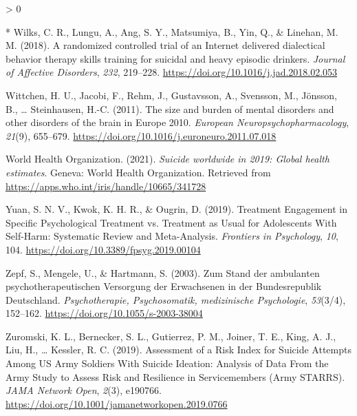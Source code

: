 \documentclass[
  english,
  man]{apa6}
\newlength{\cslhangindent}
\newenvironment{CSLReferences}[2] %
 {%
  \setlength{\parindent}{0pt}
  \ifodd #1 \everypar{\setlength{\hangindent}{\cslhangindent}}\ignorespaces\fi
  \ifnum #2 > 0
  \setlength{\parskip}{#2\baselineskip}
  \fi
 }%
 {}
\begin{document}
\begin{CSLReferences}{1}{0}
\leavevmode\hypertarget{ref-wilks2018}{}%
* Wilks, C. R., Lungu, A., Ang, S. Y., Matsumiya, B., Yin, Q., \& Linehan, M. M. (2018). A randomized controlled trial of an {Internet} delivered dialectical behavior therapy skills training for suicidal and heavy episodic drinkers. \emph{Journal of Affective Disorders}, \emph{232}, 219--228. \url{https://doi.org/10.1016/j.jad.2018.02.053}

\leavevmode\hypertarget{ref-wittchen2011a}{}%
Wittchen, H. U., Jacobi, F., Rehm, J., Gustavsson, A., Svensson, M., Jönsson, B., \ldots{} Steinhausen, H.-C. (2011). The size and burden of mental disorders and other disorders of the brain in {Europe} 2010. \emph{European Neuropsychopharmacology}, \emph{21}(9), 655--679. \url{https://doi.org/10.1016/j.euroneuro.2011.07.018}

\leavevmode\hypertarget{ref-worldhealthorganization2021}{}%
World Health Organization. (2021). \emph{Suicide worldwide in 2019: {Global} health estimates}. {Geneva}: {World Health Organization}. Retrieved from \url{https://apps.who.int/iris/handle/10665/341728}

\leavevmode\hypertarget{ref-yuan2019}{}%
Yuan, S. N. V., Kwok, K. H. R., \& Ougrin, D. (2019). Treatment {Engagement} in {Specific Psychological Treatment} vs. {Treatment} as {Usual} for {Adolescents With Self-Harm}: {Systematic Review} and {Meta-Analysis}. \emph{Frontiers in Psychology}, \emph{10}, 104. \url{https://doi.org/10.3389/fpsyg.2019.00104}

\leavevmode\hypertarget{ref-zepf2003}{}%
Zepf, S., Mengele, U., \& Hartmann, S. (2003). Zum Stand der ambulanten psychotherapeutischen Versorgung der Erwachsenen in der Bundesrepublik Deutschland. \emph{Psychotherapie, Psychosomatik, medizinische Psychologie}, \emph{53}(3/4), 152--162. \url{https://doi.org/10.1055/s-2003-38004}

\leavevmode\hypertarget{ref-zuromski2019}{}%
Zuromski, K. L., Bernecker, S. L., Gutierrez, P. M., Joiner, T. E., King, A. J., Liu, H., \ldots{} Kessler, R. C. (2019). Assessment of a {Risk Index} for {Suicide Attempts Among US Army Soldiers With Suicide Ideation}: {Analysis} of {Data From} the {Army Study} to {Assess Risk} and {Resilience} in {Servicemembers} ({Army STARRS}). \emph{JAMA Network Open}, \emph{2}(3), e190766. \url{https://doi.org/10.1001/jamanetworkopen.2019.0766}

\end{CSLReferences}

\endgroup
\end{document}
